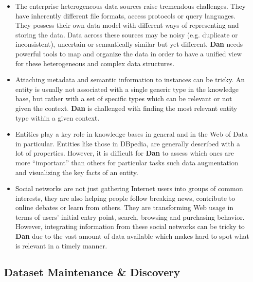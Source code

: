\begin{itemize}
	\item The enterprise heterogeneous data sources raise tremendous challenges. They have inherently different file formats, access protocols or query languages. They possess their own data model with different ways of representing and storing the data. Data across these sources may be noisy (e.g. duplicate or inconsistent), uncertain or semantically similar but yet different. \textbf{Dan} needs powerful tools to map and organize the data in order to have a unified view for these heterogeneous and complex data structures.
	\item Attaching metadata and semantic information to instances can be tricky. An entity is usually not associated with a single generic type in the knowledge base, but rather with a set of specific types which can be relevant or not given the context. \textbf{Dan} is challenged with finding the most relevant entity type within a given context.
	\item Entities play a key role in knowledge bases in general and in the Web of Data in particular. Entities like those in DBpedia, are generally described with a lot of properties. However, it is difficult for \textbf{Dan} to assess which ones are more ``important'' than others for particular tasks such data augmentation and visualizing the key facts of an entity.
	\item Social networks are not just gathering Internet users into groups of common interests, they are also helping people follow breaking news, contribute to online debates or learn from others. They are transforming Web usage in terms of users' initial entry point, search, browsing and purchasing behavior. However, integrating information from these social networks can be tricky to \textbf{Dan} due to the vast amount of data available which makes hard to spot what is relevant in a timely manner.
\end{itemize}

\subsection{Dataset Maintenance \& Discovery}

